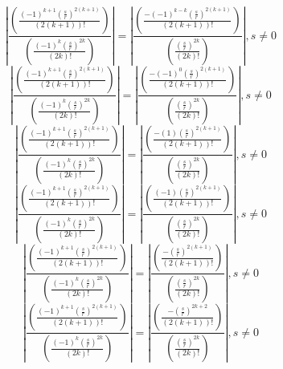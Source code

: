 \documentclass[a4paper,12pt]{report}
\begin{document}
\begin{equation}
\left|\frac{\left(\frac{(-1)^{k+1} \left(\frac{s}{r}\right)^{2(k+1)}}{(2(k+1))!}\right)}{\left(\frac{(-1)^k \left(\frac{s}{r}\right)^{2k}}{(2k)!}\right)}\right| = \left|\frac{\left(\frac{-(-1)^{k-k} \left(\frac{s}{r}\right)^{2(k+1)}}{(2(k+1))!}\right)}{\left(\frac{\left(\frac{s}{r}\right)^{2k}}{(2k)!}\right)}\right|, s \neq 0
\end{equation}
\begin{equation}
\left|\frac{\left(\frac{(-1)^{k+1} \left(\frac{s}{r}\right)^{2(k+1)}}{(2(k+1))!}\right)}{\left(\frac{(-1)^k \left(\frac{s}{r}\right)^{2k}}{(2k)!}\right)}\right| = \left|\frac{\left(\frac{-(-1)^{0} \left(\frac{s}{r}\right)^{2(k+1)}}{(2(k+1))!}\right)}{\left(\frac{\left(\frac{s}{r}\right)^{2k}}{(2k)!}\right)}\right|, s \neq 0
\end{equation}
\begin{equation}
\left|\frac{\left(\frac{(-1)^{k+1} \left(\frac{s}{r}\right)^{2(k+1)}}{(2(k+1))!}\right)}{\left(\frac{(-1)^k \left(\frac{s}{r}\right)^{2k}}{(2k)!}\right)}\right| = \left|\frac{\left(\frac{-(1) \left(\frac{s}{r}\right)^{2(k+1)}}{(2(k+1))!}\right)}{\left(\frac{\left(\frac{s}{r}\right)^{2k}}{(2k)!}\right)}\right|, s \neq 0
\end{equation}
\begin{equation}
\left|\frac{\left(\frac{(-1)^{k+1} \left(\frac{s}{r}\right)^{2(k+1)}}{(2(k+1))!}\right)}{\left(\frac{(-1)^k \left(\frac{s}{r}\right)^{2k}}{(2k)!}\right)}\right| = \left|\frac{\left(\frac{(-1) \left(\frac{s}{r}\right)^{2(k+1)}}{(2(k+1))!}\right)}{\left(\frac{\left(\frac{s}{r}\right)^{2k}}{(2k)!}\right)}\right|, s \neq 0
\end{equation}
\begin{equation}
\left|\frac{\left(\frac{(-1)^{k+1} \left(\frac{s}{r}\right)^{2(k+1)}}{(2(k+1))!}\right)}{\left(\frac{(-1)^k \left(\frac{s}{r}\right)^{2k}}{(2k)!}\right)}\right| = \left|\frac{\left(\frac{-\left(\frac{s}{r}\right)^{2(k+1)}}{(2(k+1))!}\right)}{\left(\frac{\left(\frac{s}{r}\right)^{2k}}{(2k)!}\right)}\right|, s \neq 0
\end{equation}
\begin{equation}
\left|\frac{\left(\frac{(-1)^{k+1} \left(\frac{s}{r}\right)^{2(k+1)}}{(2(k+1))!}\right)}{\left(\frac{(-1)^k \left(\frac{s}{r}\right)^{2k}}{(2k)!}\right)}\right| = \left|\frac{\left(\frac{-\left(\frac{s}{r}\right)^{2k+2}}{(2(k+1))!}\right)}{\left(\frac{\left(\frac{s}{r}\right)^{2k}}{(2k)!}\right)}\right|, s \neq 0
\end{equation}
\end{document}
